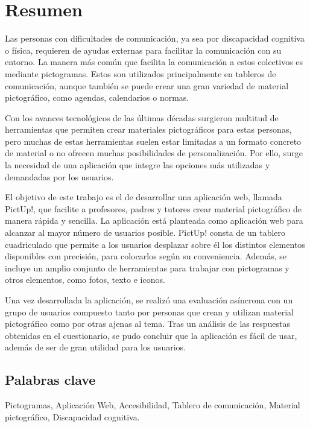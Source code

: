 \chapter*{Resumen}

Las personas con dificultades de comunicación, ya sea por discapacidad cognitiva o física, requieren de ayudas externas para facilitar la comunicación con su entorno. La manera más común que facilita la comunicación a estos colectivos es mediante  pictogramas. Estos son utilizados principalmente en tableros de comunicación, aunque también se puede crear una gran variedad de material pictográfico, como agendas, calendarios o normas.

Con los avances tecnológicos de las últimas décadas surgieron multitud de herramientas que permiten crear materiales pictográficos para estas personas, pero muchas de estas herramientas suelen estar limitadas a un formato concreto de material o no ofrecen muchas posibilidades de personalización. Por ello, surge la necesidad de una aplicación que integre las opciones más utilizadas y demandadas por los usuarios. 

El objetivo de este trabajo es el de desarrollar una aplicación web, llamada PictUp!, que facilite a profesores, padres y tutores crear material pictográfico de manera rápida y sencilla. La aplicación está planteada como aplicación web para alcanzar al mayor número de usuarios posible. PictUp! consta de un tablero cuadriculado que permite a los usuarios desplazar sobre él los distintos elementos disponibles con precisión, para colocarlos según su conveniencia. Además, se incluye un amplio conjunto de herramientas para trabajar con pictogramas y otros elementos, como fotos, texto e iconos.

Una vez desarrollada la aplicación, se realizó una evaluación asíncrona con un grupo de usuarios compuesto tanto por personas que crean y utilizan material pictográfico como por otras ajenas al tema. Tras un análisis de las respuestas obtenidas en el cuestionario, se pudo concluir que la aplicación es fácil de usar, además de ser de gran utilidad para los usuarios.


\section*{Palabras clave}
   
\noindent Pictogramas, Aplicación Web, Accesibilidad, Tablero de comunicación, Material pictográfico, Discapacidad cognitiva. 

   


